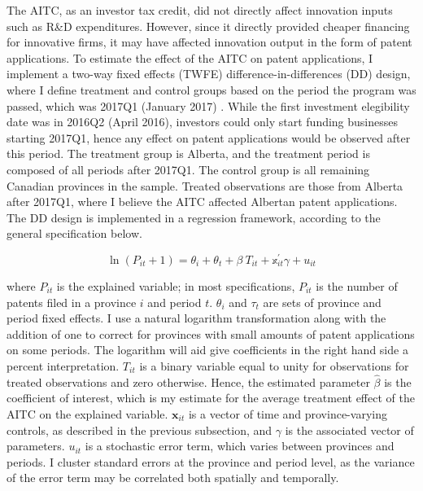 \documentclass[../main.tex]{subfiles}
\begin{document}
The AITC, as an investor tax credit, did not directly affect innovation inputs such as R\&D expenditures. However, since it directly provided cheaper financing for innovative firms, it may have affected innovation output in the form of patent applications. To estimate the effect of the AITC on patent applications, I implement a two-way fixed effects (TWFE) difference-in-differences (DD) design, where I define treatment and control groups based on the period the program was passed, which was 2017Q1 (January 2017) \parencite{albertaeconomicdevelopmentandtrade17}. While the first investment elegibility date was in 2016Q2 (April 2016), investors could only start funding businesses starting 2017Q1, hence any effect on patent applications would be observed after this period. The treatment group is Alberta, and the treatment period is composed of all periods after 2017Q1. The control group is all remaining Canadian provinces in the sample. Treated observations are those from Alberta after 2017Q1, where I believe the AITC affected Albertan patent applications. The DD design is implemented in a regression framework, according to the general specification below.

\begin{equation}
    \label{eq:dd_model}
    \ln(P_{it} + 1) = \theta_i + \theta_t + \beta \ T_{it} + \mathbb{x}_{it}^{'} \gamma + u_{it}
\end{equation}

where $P_{it}$ is the explained variable; in most specifications, $P_{it}$ is the number of patents filed in a province $i$ and period $t$. $\theta_i$ and $\tau_t$ are sets of province and period fixed effects. I use a natural logarithm transformation along with the addition of one to correct for provinces with small amounts of patent applications on some periods. The logarithm will aid give coefficients in the right hand side a percent interpretation. $T_{it}$ is a binary variable equal to unity for observations for treated observations and zero otherwise. Hence, the estimated parameter $\hat{\beta}$ is the coefficient of interest, which is my estimate for the average treatment effect of the AITC on the explained variable. $\mathbf{x}_{it}$ is a vector of time and province-varying controls, as described in the previous subsection, and $\gamma$ is the associated vector of parameters. $u_{it}$ is a stochastic error term, which varies between provinces and periods. I cluster standard errors at the province and period level, as the variance of the error term may be correlated both spatially and temporally.
\end{document}
